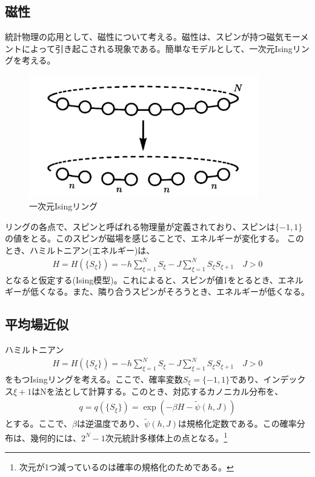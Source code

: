 \documentclass[a4paper,11pt]{jsarticle}
\numberwithin{equation}{section}
\begin{document}
\subsection{磁性}
統計物理の応用として、磁性について考える。磁性は、スピンが持つ磁気モーメントによって引き起こされる現象である。簡単なモデルとして、一次元Isingリングを考える。
\begin{figure}[H]
    \begin{center}
    \includegraphics[width=100mm]{isin.png}
    \end{center}
    \caption{一次元Isingリング}
    \label{fig:ring}
\end{figure}
リングの各点で、スピンと呼ばれる物理量が定義されており、スピンは$\{-1,1\}$の値をとる。このスピンが磁場を感じることで、エネルギーが変化する。
このとき、ハミルトニアン(エネルギー)は、
\begin{align}
    H = H(\{S_{\xi}\}) = -h\sum_{\xi=1}^{N} S_{\xi} -J\sum_{\xi=1}^{N} S_{\xi}S_{\xi+1} \quad J>0
\end{align}
となると仮定する(Ising模型)。これによると、スピンが値1をとるとき、エネルギーが低くなる。また、隣り合うスピンがそろうとき、エネルギーが低くなる。

\subsection{平均場近似}
ハミルトニアン
\begin{align}
    H = H(\{S_{\xi}\}) = -h\sum_{\xi=1}^{N} S_{\xi} -J\sum_{\xi=1}^{N} S_{\xi}S_{\xi+1} \quad J>0
\end{align}
をもつIsingリングを考える。ここで、確率変数$S_{\xi} = \{-1,1\}$であり、インデックス$\xi +1$はNを法として計算する。このとき、対応するカノニカル分布を、
\begin{align}
    q =q(\{S_{\xi}\}) = \exp(-\beta H - \tilde{\psi}(h,J))
\end{align}
とする。ここで、$\beta $は逆温度であり、$\tilde{\psi}(h,J)$は規格化定数である。この確率分布は、幾何的には、$2^N-1$次元統計多様体上の点となる。\footnote{次元が1つ減っているのは確率の規格化のためである。}
\end{document}

